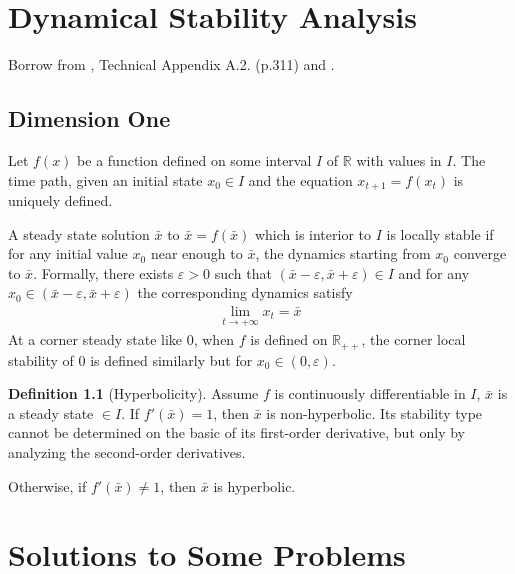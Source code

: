 \documentclass[11pt,a4paper]{book}
\theoremstyle{definition}\newtheorem{definition}{Definition}
\theoremstyle{definition}\newtheorem{fact}{Fact}
\theoremstyle{definition}\newtheorem{remark}{Remark}
\theoremstyle{definition}\newtheorem{ex}{Ex.}
\theoremstyle{definition}\newtheorem{project}{Project}
\theoremstyle{definition}\newtheorem{problem}{Problem}
\theoremstyle{definition}\newtheorem{example}{Example}
\numberwithin{theorem}{section}
\numberwithin{corollary}{chapter}
\numberwithin{assumption}{chapter}
\numberwithin{definition}{chapter}
\numberwithin{prop}{chapter}
\numberwithin{notation}{chapter}
\numberwithin{problem}{chapter}
\numberwithin{example}{chapter}
\numberwithin{fact}{chapter}
\numberwithin{ex}{chapter}
\def\R{\mathbb R}
\def\R{\mathbb R}
\begin{document}
\begin{appendices}
	\chapter{Dynamical Stability Analysis} \label{sec:appendix_dyn}
	Borrow from \citet{de2002theory}, Technical Appendix A.2. (p.311) and \citet{dannan2003stability}.
	\section{Dimension One}
	Let $f(x)$ be a function defined on some interval $I$ of $\R$ with values in $I$. The time path, given an initial state $x_0 \in I$ and the equation $x_{t+1} = f(x_t)$ is uniquely defined.
	
	A steady state solution $\bar{x}$ to $\bar{x} = f(\bar{x})$ which is interior to $I$ is locally stable if for any initial value $x_0$ near enough to $\bar{x}$, the dynamics starting from $x_0$ converge to $\bar{x}$. Formally, there exists $\varepsilon > 0$ such that $(\bar{x}-\varepsilon, \bar{x} + \varepsilon) \in I$ and for any $x_0 \in (\bar{x}-\varepsilon, \bar{x} + \varepsilon)$ the corresponding dynamics satisfy
	\begin{align*}
		\lim_{t\to +\infty} x_t = \bar{x}
	\end{align*}
	At a corner steady state like 0, when $f$ is defined on $\R_{++}$, the corner local stability of 0 is defined similarly but for $x_0 \in (0,\varepsilon)$.
	
	\begin{definition}[Hyperbolicity]
		Assume $f$ is continuously differentiable in $I$, $\bar{x}$ is a steady state $\in I$. If $f'(\bar{x}) =1$, then $\bar{x}$ is non-hyperbolic. Its stability type cannot be determined on the basic of its first-order derivative, but only by analyzing the second-order derivatives. 
		
		Otherwise, if $f'(\bar{x}) \neq 1$, then $\bar{x}$ is hyperbolic.
	\end{definition}	
	
	\chapter{Solutions to Some Problems}

\end{appendices}
\end{document}
